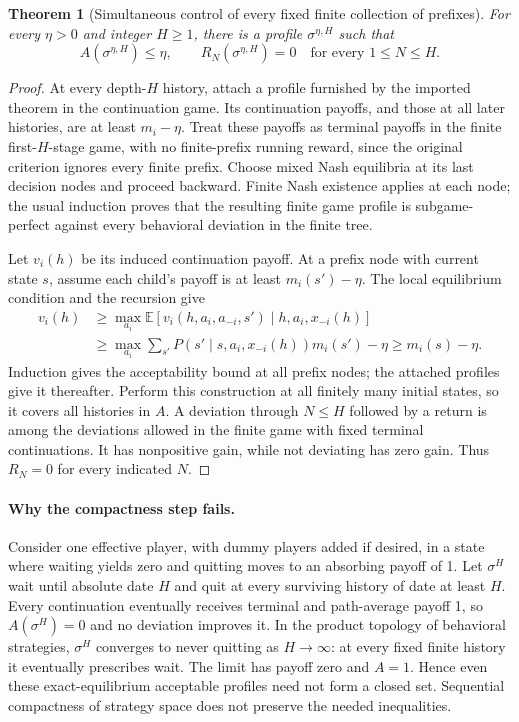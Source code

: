 \documentclass[11pt,a4paper]{article}
\newcommand{\E}{\mathbb E}
\newtheorem{theorem}{Theorem}[section]
\theoremstyle{definition}
\theoremstyle{remark}
\begin{document}
\begin{theorem}[Simultaneous control of every fixed finite collection of prefixes]
For every $\eta>0$ and integer $H\geq1$, there is a profile $\sigma^{\eta,H}$ such that
\[
 A(\sigma^{\eta,H})\leq\eta,\qquad
 R_N(\sigma^{\eta,H})=0\quad\text{for every }1\leq N\leq H.
\]
\end{theorem}
\begin{proof}
At every depth-$H$ history, attach a profile furnished by the imported theorem in the continuation game. Its continuation payoffs, and those at all later histories, are at least $m_i-\eta$. Treat these payoffs as terminal payoffs in the finite first-$H$-stage game, with no finite-prefix running reward, since the original criterion ignores every finite prefix. Choose mixed Nash equilibria at its last decision nodes and proceed backward. Finite Nash existence applies at each node; the usual induction proves that the resulting finite game profile is subgame-perfect against every behavioral deviation in the finite tree.

Let $v_i(h)$ be its induced continuation payoff. At a prefix node with current state $s$, assume each child's payoff is at least $m_i(s')-\eta$. The local equilibrium condition and the recursion give
\begin{align*}
 v_i(h)&\geq\max_{a_i}\E[v_i(h,a_i,a_{-i},s')\mid h,a_i,x_{-i}(h)]\\
 &\geq\max_{a_i}\sum_{s'}P(s'\mid s,a_i,x_{-i}(h))m_i(s')-\eta
 \geq m_i(s)-\eta.
\end{align*}
Induction gives the acceptability bound at all prefix nodes; the attached profiles give it thereafter. Perform this construction at all finitely many initial states, so it covers all histories in $A$. A deviation through $N\leq H$ followed by a return is among the deviations allowed in the finite game with fixed terminal continuations. It has nonpositive gain, while not deviating has zero gain. Thus $R_N=0$ for every indicated $N$.
\end{proof}

\paragraph{Why the compactness step fails.}
Consider one effective player, with dummy players added if desired, in a state where waiting yields zero and quitting moves to an absorbing payoff of 1. Let $\sigma^H$ wait until absolute date $H$ and quit at every surviving history of date at least $H$. Every continuation eventually receives terminal and path-average payoff 1, so $A(\sigma^H)=0$ and no deviation improves it. In the product topology of behavioral strategies, $\sigma^H$ converges to never quitting as $H\to\infty$: at every fixed finite history it eventually prescribes wait. The limit has payoff zero and $A=1$. Hence even these exact-equilibrium acceptable profiles need not form a closed set. Sequential compactness of strategy space does not preserve the needed inequalities.
\end{document}
